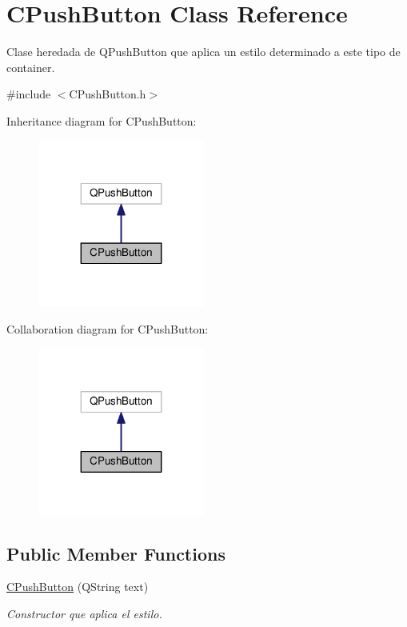 \hypertarget{classCPushButton}{}\section{C\+Push\+Button Class Reference}
\label{classCPushButton}


Clase heredada de \textquotesingle{}Q\+Push\+Button\textquotesingle{} que aplica un estilo determinado a este tipo de container.  




{\ttfamily \#include $<$C\+Push\+Button.\+h$>$}



Inheritance diagram for C\+Push\+Button\+:
\nopagebreak
\begin{figure}[H]
\begin{center}
\leavevmode
\includegraphics[width=155pt]{classCPushButton__inherit__graph}
\end{center}
\end{figure}


Collaboration diagram for C\+Push\+Button\+:
\nopagebreak
\begin{figure}[H]
\begin{center}
\leavevmode
\includegraphics[width=155pt]{classCPushButton__coll__graph}
\end{center}
\end{figure}
\subsection*{Public Member Functions}
\begin{DoxyCompactItemize}
\item 
\hyperlink{classCPushButton_a57826ce36e788184e955d492c93425c9}{C\+Push\+Button} (Q\+String text)
\begin{DoxyCompactList}\small\item\em Constructor que aplica el estilo. \end{DoxyCompactList}\end{DoxyCompactItemize}


